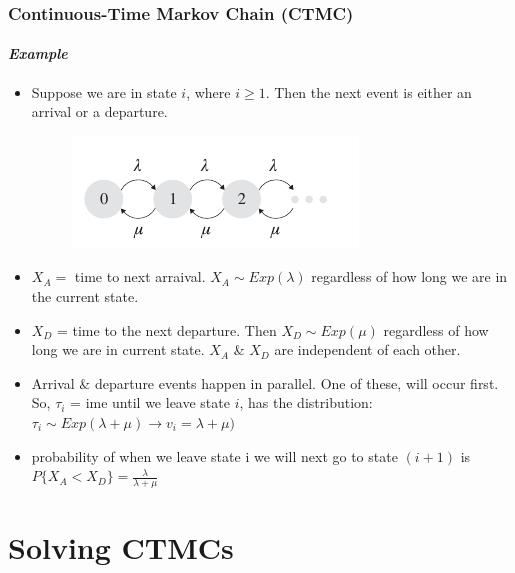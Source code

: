 \documentclass{beamer}
\begin{document}
\begin{frame} 
\frametitle{Continuous-Time Markov Chain (CTMC) }
\framesubtitle{\textbf{\textit{Example}}}
\begin{itemize}

\item Suppose we are in state $i$, where $i \geq 1$. Then the next event is either an arrival or a departure.

\begin{figure}
        \begin{center}
		\includegraphics[scale=0.5]{images/single_server_network.jpeg}
        \end{center}
		\end{figure}
\item $X_A = $ time to next arraival.  $X_A\sim  Exp(\lambda)$ regardless of
how long we are in the current state. 
\item $X_D$ = time to the
next departure. Then $X_D \sim Exp(\mu)$ regardless of how long we are in
current state. $X_A$ \& $X_D$ are independent of each other.
\item Arrival \& departure events happen in parallel. One of these, will occur first. So, $\tau_i$ = ime until we leave state $i$, has the
distribution: $\tau_i \sim Exp(\lambda + \mu) \rightarrow v_i = \lambda + \mu)$
\item probability of when we leave state i we will next go to state $(i + 1)$ is
$P \{X_A < X_D \} = \frac{\lambda}{\lambda + \mu}$


\end{itemize}

\end{frame}


\section { Solving CTMCs}
\end{document}
